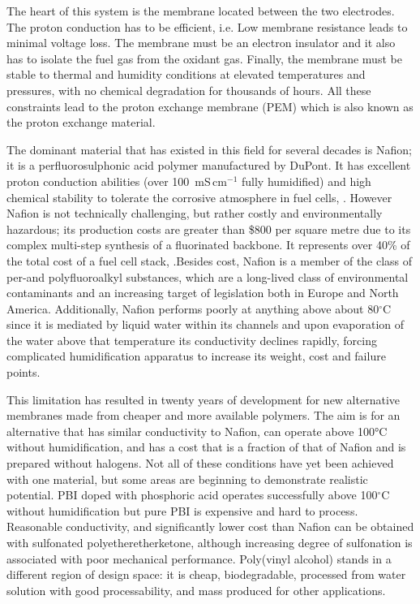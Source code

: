 \documentclass[12pt,a4paper]{report}
\begin{document}
The heart of this system is the membrane located between the two electrodes. The proton conduction has to be efficient, i.e. Low membrane resistance leads to minimal voltage loss. The membrane must be an electron insulator and it also has to isolate the fuel gas from the oxidant gas. Finally, the membrane must be stable to thermal and humidity conditions at elevated temperatures and pressures, with no chemical degradation for thousands of hours. All these constraints lead to the proton exchange membrane (PEM) which is also known as the proton exchange material. \cite{3,4}

The dominant material that has existed in this field for several decades is Nafion; it is a perfluorosulphonic acid polymer manufactured by DuPont. It has excellent proton conduction abilities (over 100~mS\,cm\(^{-1}\) fully humidified) and high chemical stability to tolerate the corrosive atmosphere in fuel cells, \cite{5,6}. However Nafion is not technically challenging, but rather costly and environmentally hazardous; its production costs are greater than \$800 per square metre due to its complex multi-step synthesis of a fluorinated backbone. It represents over 40\% of the total cost of a fuel cell stack, \cite{1,4}.Besides cost, Nafion is a member of the class of per-and polyfluoroalkyl substances, which are a long-lived class of environmental contaminants and an increasing target of legislation both in Europe and North America.\cite{24} Additionally, Nafion performs poorly at anything above about 80\(^\circ\)C since it is mediated by liquid water within its channels and upon evaporation of the water above that temperature its conductivity declines rapidly, forcing complicated humidification apparatus to increase its weight, cost and failure points.\cite{3,4,5}

This limitation has resulted in twenty years of development for new alternative membranes made from cheaper and more available polymers. The aim is for an alternative that has similar conductivity to Nafion, can operate above 100°C without humidification, and has a cost that is a fraction of that of Nafion and is prepared without halogens. Not all of these conditions have yet been achieved with one material, but some areas are beginning to demonstrate realistic potential. PBI doped with phosphoric acid operates successfully above 100\(^\circ\)C without humidification but pure PBI is expensive and hard to process.\cite{20} 
Reasonable conductivity, and significantly lower cost than Nafion can be obtained with sulfonated polyetheretherketone, although increasing degree of sulfonation is associated with poor mechanical performance.\cite{18,19} Poly(vinyl alcohol) stands in a different region of design space: it is cheap, biodegradable, processed from water solution with good processability, and mass produced for other applications.\cite{9,10}
\end{document}

